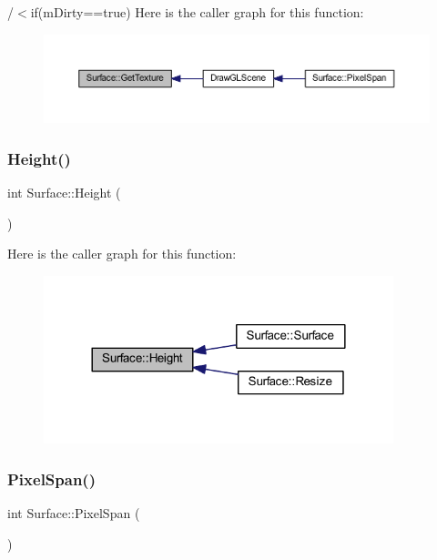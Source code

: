 /$<$if(m\+Dirty==true) Here is the caller graph for this function\+:\nopagebreak
\begin{figure}[H]
\begin{center}
\leavevmode
\includegraphics[width=350pt]{class_surface_a2cd8789d26457187b8af4be8c178e9d4_icgraph}
\end{center}
\end{figure}
\mbox{\label{class_surface_ab901f48d51b3fd427415b580dc15518c}} 
\subsubsection{Height()}
{\footnotesize\ttfamily int Surface\+::\+Height (\begin{DoxyParamCaption}{ }\end{DoxyParamCaption})\hspace{0.3cm}{\ttfamily [inline]}}

Here is the caller graph for this function\+:\nopagebreak
\begin{figure}[H]
\begin{center}
\leavevmode
\includegraphics[width=288pt]{class_surface_ab901f48d51b3fd427415b580dc15518c_icgraph}
\end{center}
\end{figure}
\mbox{\label{class_surface_abe0d542404575c60911d6ad4219560f9}} 
\subsubsection{Pixel\+Span()}
{\footnotesize\ttfamily int Surface\+::\+Pixel\+Span (\begin{DoxyParamCaption}{ }\end{DoxyParamCaption})\hspace{0.3cm}{\ttfamily [inline]}}

